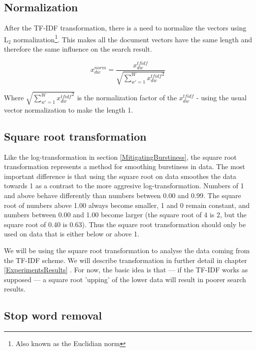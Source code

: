 \subsection{Normalization} 

After the TF-IDF transformation, there is a need to normalize the
vectors using L$_2$ normalization\footnote{Also known as the
  Euclidian norm}. This makes all the document vectors have the same
length and therefore the same influence on the search result.

\[
x_{dw}^{norm} = \frac{x_{dw}^{tfidf}}{\sqrt{\sum_{w\prime = 1}^{W} {x_{dw}^{tfidf}}^{2}}}
\]

Where $\sqrt{\sum_{w\prime = 1}^{W} {x_{dw}^{tfidf}}^{2}}$ is the
normalization factor of the $x_{dw}^{tfidf}$ - using the usual vector
normalization to make the length 1.

\subsection{Square root transformation\label{SquareRoot}}

Like the log-transformation in section \ref{MitigatingBurstiness}, the square
root transformation represents a method for smoothing burstiness in
data. The most important difference is that using the square root on
data smoothes the data towards 1 as a contrast to the more aggresive
log-transformation. Numbers of 1 and above behave differently than
numbers between 0.00 and 0.99. The square root of numbers above 1.00
always become smaller, 1 and 0 remain constant, and numbers
between 0.00 and 1.00 become larger (the square root of 4 is 2, but
the square root of 0.40 is 0.63). Thus the square root transformation
should only be used on data that is either below or above 1.


We will be using the square root transformation to analyse the data
coming from the TF-IDF scheme. We will describe transformation in
further detail in chapter \ref{ExperimentsResults} . For now, the basic idea is that --- if the TF-IDF
works as supposed --- a square root 'upping' of the lower data will
result in poorer search results.

\subsection{Stop word removal}

